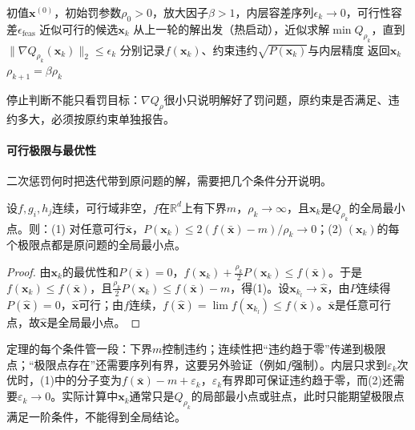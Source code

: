 \begin{algorithm}[二次惩罚法]
\label{alg:opt-con-quadratic-penalty}
\begin{algorithmic}[1]
\Require 初值$\bm x^{(0)}$，初始罚参数$\rho_0>0$，放大因子$\beta>1$，内层容差序列$\epsilon_k\to0$，可行性容差$\epsilon_{\mathrm{feas}}$
\Ensure 近似可行的候选$\bm x_k$
  \State 从上一轮的解出发（热启动），近似求解$\min Q_{\rho_k}$，直到$\lVert\nabla Q_{\rho_k}(\bm x_k)\rVert_2\leq\epsilon_k$
  \State 分别记录$f(\bm x_k)$、约束违约$\sqrt{P(\bm x_k)}$与内层精度
    \State 返回$\bm x_k$
  \EndIf
  \State $\rho_{k+1}=\beta\rho_k$
\EndFor
\end{algorithmic}
\end{algorithm}

停止判断不能只看罚目标：$\nabla Q_\rho$很小只说明解好了罚问题，原约束是否满足、违约多大，必须按原约束单独报告。

\paragraph{可行极限与最优性}
二次惩罚何时把迭代带到原问题的解，需要把几个条件分开说明。

\begin{theorem}[二次惩罚的极限]
\label{thm:opt-con-quadratic-penalty}
设$f,g_i,h_j$连续，可行域非空，$f$在$\mathbb R^d$上有下界$m$，$\rho_k\to\infty$，且$\bm x_k$是$Q_{\rho_k}$的全局最小点。则：(1) 对任意可行$\bar{\bm x}$，$P(\bm x_k)\leq2(f(\bar{\bm x})-m)/\rho_k\to0$；(2) $(\bm x_k)$的每个极限点都是原问题的全局最小点。
\end{theorem}

\begin{proof}
由$\bm x_k$的最优性和$P(\bar{\bm x})=0$，$f(\bm x_k)+\frac{\rho_k}2P(\bm x_k)\leq f(\bar{\bm x})$。于是$f(\bm x_k)\leq f(\bar{\bm x})$，且$\frac{\rho_k}2P(\bm x_k)\leq f(\bar{\bm x})-m$，得(1)。设$\bm x_{k_l}\to\hat{\bm x}$，由$P$连续得$P(\hat{\bm x})=0$，$\hat{\bm x}$可行；由$f$连续，$f(\hat{\bm x})=\lim f(\bm x_{k_l})\leq f(\bar{\bm x})$。$\bar{\bm x}$是任意可行点，故$\hat{\bm x}$是全局最小点。
\end{proof}

定理的每个条件管一段：下界$m$控制违约；连续性把“违约趋于零”传递到极限点；“极限点存在”还需要序列有界，这要另外验证（例如$f$强制）。内层只求到$\varepsilon_k$次优时，(1)中的分子变为$f(\bar{\bm x})-m+\varepsilon_k$，$\varepsilon_k$有界即可保证违约趋于零，而(2)还需要$\varepsilon_k\to0$。实际计算中$\bm x_k$通常只是$Q_{\rho_k}$的局部最小点或驻点，此时只能期望极限点满足一阶条件，不能得到全局结论。

